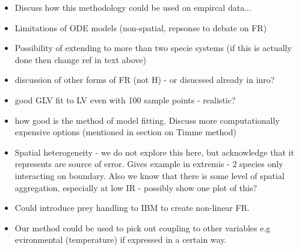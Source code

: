 \begin{itemize}
	\item Discuss how this methodology could be used on empircal data...
	\item Limitations of ODE models (non-spatial, repsonse to debate on FR)
	\item Possibility of extending to more than two specie systems (if this is actually done then change ref in text above)
	\item discussion of other forms of FR (not H) - or disucssed already in inro?
	
	\item good GLV fit to LV even with 100 sample points - realistic?
	
	\item how good is the method of model fitting. Discuss more computationally expensive options (mentioned in section on Timme method)
	
	\item Spatial heterogeneity - we do not explore this here, but acknowledge that it represents are source of error. Gives example in extremis - 2 species only interacting on boundary. Also we know that there is some level of spatial aggregation, especially at low IR - possibly show one plot of this?
	
	\item Could introduce prey handling to IBM to create non-linear FR.
	
	\item Our method could be used to pick out coupling to other variables e.g evironmental (temperature) if expressed in a certain way.
\end{itemize}
